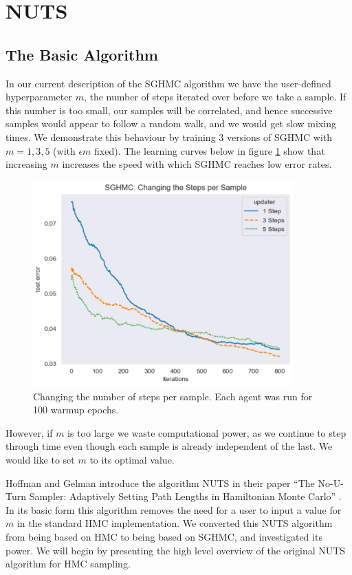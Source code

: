 \section{NUTS}
\subsection{The Basic Algorithm}

In our current description of the SGHMC algorithm we have the user-defined hyperparameter $m$, the number of steps iterated over before we take a sample. If this number is too small, our samples will be correlated, and hence successive samples would appear to follow a random walk, and we would get slow mixing times. We demonstrate this behaviour by training 3 versions of SGHMC with $m=1,3,5$ (with $\epsilon m$ fixed). The learning curves below in figure \ref{num_steps} show that increasing $m$ increases the speed with which SGHMC reaches low error rates.

\begin{figure}[h!]
\centering
\includegraphics[width=100mm]{parts/Images/changing_num_steps.png}
\caption{Changing the number of steps per sample. Each agent was run for 100 warmup epochs.}
\label{num_steps}
\end{figure}

However, if $m$ is too large we waste computational power, as we continue to step through time even though each sample is already independent of the last. We would like to set $m$ to its optimal value.

Hoffman and Gelman introduce the algorithm NUTS in their paper ``The No-U-Turn Sampler: Adaptively Setting Path Lengths in Hamiltonian Monte Carlo'' \cite{nuts}. In its basic form this algorithm removes the need for a user to input a value for $m$ in the standard HMC implementation. We converted this NUTS algorithm from being based on HMC to being based on SGHMC, and investigated its power. We will begin by presenting the high level overview of the original NUTS algorithm for HMC sampling.

